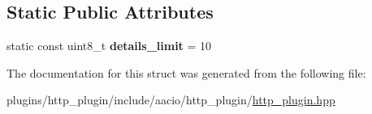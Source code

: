 \subsection*{Static Public Attributes}
\begin{DoxyCompactItemize}
\item 
\mbox{\label{structaacio_1_1error__results_1_1error__info_a08386f90b5ce5581c78a0c2f05119943}} 
static const uint8\+\_\+t {\bfseries details\+\_\+limit} = 10
\end{DoxyCompactItemize}


The documentation for this struct was generated from the following file\+:\begin{DoxyCompactItemize}
\item 
plugins/http\+\_\+plugin/include/aacio/http\+\_\+plugin/\mbox{\hyperlink{http__plugin_8hpp}{http\+\_\+plugin.\+hpp}}\end{DoxyCompactItemize}
